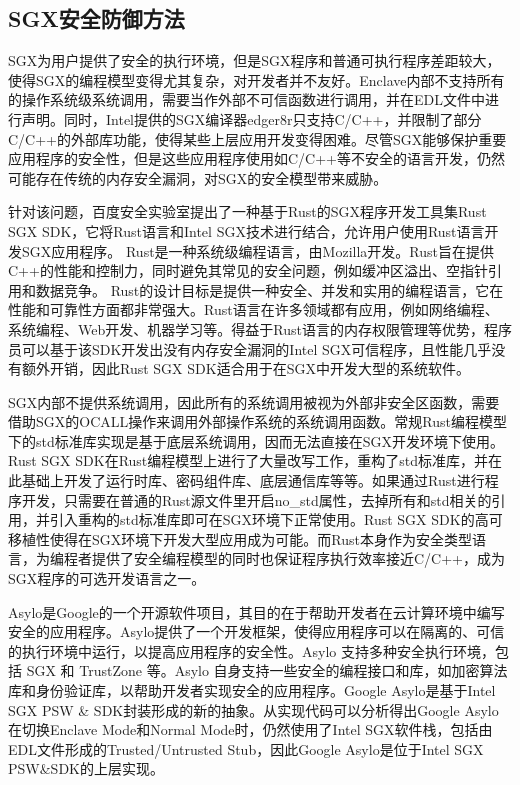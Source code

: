 \documentclass[twocolumn]{source/Paper}
\begin{document}
        \subsection{SGX安全防御方法}
        SGX为用户提供了安全的执行环境，但是SGX程序和普通可执行程序差距较大，使得SGX的编程模型变得尤其复杂，对开发者并不友好。Enclave内部不支持所有的操作系统级系统调用，需要当作外部不可信函数进行调用，并在EDL文件中进行声明。同时，Intel提供的SGX编译器edger8r只支持C/C++，并限制了部分C/C++的外部库功能，使得某些上层应用开发变得困难。尽管SGX能够保护重要应用程序的安全性，但是这些应用程序使用如C/C++等不安全的语言开发，仍然可能存在传统的内存安全漏洞，对SGX的安全模型带来威胁。
        
        针对该问题，百度安全实验室提出了一种基于Rust的SGX程序开发工具集Rust SGX SDK\cite{wang2019towards}，它将Rust语言和Intel SGX技术进行结合，允许用户使用Rust语言开发SGX应用程序。
        Rust是一种系统级编程语言，由Mozilla开发。Rust旨在提供C++的性能和控制力，同时避免其常见的安全问题，例如缓冲区溢出、空指针引用和数据竞争。 Rust的设计目标是提供一种安全、并发和实用的编程语言，它在性能和可靠性方面都非常强大。Rust语言在许多领域都有应用，例如网络编程、系统编程、Web开发、机器学习等。得益于Rust语言的内存权限管理等优势，程序员可以基于该SDK开发出没有内存安全漏洞的Intel SGX可信程序，且性能几乎没有额外开销，因此Rust SGX SDK适合用于在SGX中开发大型的系统软件。

        SGX内部不提供系统调用，因此所有的系统调用被视为外部非安全区函数，需要借助SGX的OCALL操作来调用外部操作系统的系统调用函数。常规Rust编程模型下的std标准库实现是基于底层系统调用，因而无法直接在SGX开发环境下使用。Rust SGX SDK在Rust编程模型上进行了大量改写工作，重构了std标准库，并在此基础上开发了运行时库、密码组件库、底层通信库等等。如果通过Rust进行程序开发，只需要在普通的Rust源文件里开启no\_std属性，去掉所有和std相关的引用，并引入重构的std标准库即可在SGX环境下正常使用。Rust SGX SDK的高可移植性使得在SGX环境下开发大型应用成为可能。而Rust本身作为安全类型语言，为编程者提供了安全编程模型的同时也保证程序执行效率接近C/C++，成为SGX程序的可选开发语言之一。

        Asylo\cite{asylo}是Google的一个开源软件项目，其目的在于帮助开发者在云计算环境中编写安全的应用程序。Asylo提供了一个开发框架，使得应用程序可以在隔离的、可信的执行环境中运行，以提高应用程序的安全性。Asylo 支持多种安全执行环境，包括 SGX 和 TrustZone 等。Asylo 自身支持一些安全的编程接口和库，如加密算法库和身份验证库，以帮助开发者实现安全的应用程序。Google Asylo是基于Intel SGX PSW \& SDK封装形成的新的抽象。从实现代码可以分析得出Google Asylo在切换Enclave Mode和Normal Mode时，仍然使用了Intel SGX软件栈，包括由EDL文件形成的Trusted/Untrusted Stub，因此Google Asylo是位于Intel SGX PSW\&SDK的上层实现。
\end{document}
